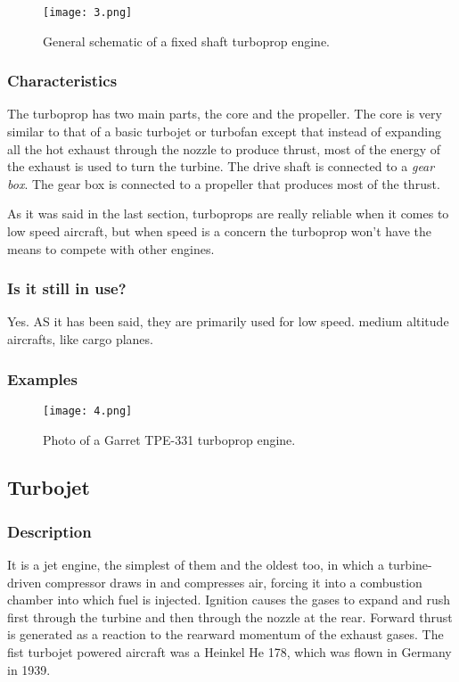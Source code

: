 \documentclass[12pt, letterpaper]{article}
\begin{document}
\begin{figure}[H]
	\centering
	\texttt{[image: 3.png]}
	\caption{General schematic of a fixed shaft turboprop engine.}
\end{figure}

\subsubsection*{Characteristics}
The turboprop has two main parts, the core and the propeller. The core is very similar to that of a basic turbojet or turbofan except that instead of expanding all the hot exhaust through the nozzle to produce thrust, most of the energy of the exhaust is used to turn the turbine. The drive shaft is connected to a \textit{gear box}. The gear box is connected to a propeller that produces most of the thrust.

As it was said in the last section, turboprops are really reliable when it comes to low speed aircraft, but when speed is a concern the turboprop won't have the means to compete with other engines.
\subsubsection*{Is it still in use?}
Yes. AS it has been said, they are primarily used for low speed. medium altitude aircrafts, like cargo planes.

\subsubsection*{Examples}
\begin{figure}[H]
	\centering
	\texttt{[image: 4.png]}
	\caption{Photo of a Garret TPE-331 turboprop engine.}
\end{figure}

\subsection*{Turbojet}

\subsubsection*{Description}
It is a jet engine, the simplest of them and the oldest too, in which a turbine-driven compressor draws in and compresses air, forcing it into a combustion chamber into which fuel is injected. Ignition causes the gases to expand and rush first through the turbine and then through the nozzle at the rear. Forward thrust is generated as a reaction to the rearward momentum of the exhaust gases.
The fist turbojet powered aircraft was a Heinkel He 178, which was flown in Germany in 1939.\autocite{britannica00}
\end{document}
